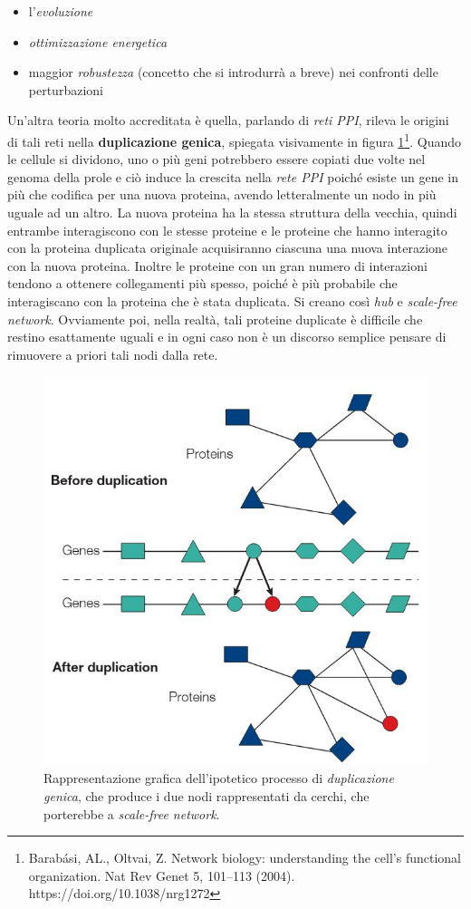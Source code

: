 \documentclass[a4paper,12pt, oneside]{book}
\begin{document}
\begin{itemize}
  \item l'\textit{evoluzione}
  \item \textit{ottimizzazione energetica}
  \item maggior \textit{robustezza} (concetto che si introdurrà a breve) nei
  confronti delle perturbazioni 
\end{itemize}
Un'altra teoria molto accreditata è quella, parlando di \textit{reti PPI},
rileva le origini di tali reti nella \textbf{duplicazione genica}, spiegata
visivamente in figura \ref{fig:dup}\footnote{Barabási, AL., Oltvai, Z. Network
  biology: understanding the cell's functional organization. Nat Rev Genet 5,
  101–113 (2004). https://doi.org/10.1038/nrg1272}. Quando le 
cellule si dividono, uno o più geni potrebbero essere copiati due volte nel
genoma della prole e ciò induce la crescita nella \textit{rete PPI} poiché
esiste un gene in più che codifica per una nuova proteina, avendo letteralmente
un nodo in più uguale ad un altro. La nuova proteina ha la stessa struttura
della vecchia, quindi entrambe interagiscono con le stesse proteine e le
proteine che hanno interagito con la proteina duplicata originale acquisiranno
ciascuna una nuova interazione con la nuova proteina. Inoltre le proteine con un
gran numero di interazioni tendono a ottenere collegamenti più spesso, poiché è
più probabile che interagiscano con la proteina che è stata
duplicata. Si creano così \textit{hub} e \textit{scale-free network}. Ovviamente
poi, nella realtà, tali proteine duplicate è difficile che 
restino esattamente uguali e in ogni caso non è un discorso semplice pensare di
rimuovere a priori tali nodi dalla rete.\\
\begin{figure}
  \centering
  \includegraphics[scale = 1.5]{img/dup.jpg}
  \caption{Rappresentazione grafica dell'ipotetico processo di
    \textit{duplicazione genica}, che produce i due nodi rappresentati da
    cerchi, che porterebbe a \textit{scale-free network}.}  
  \label{fig:dup}
\end{figure}
\end{document}
